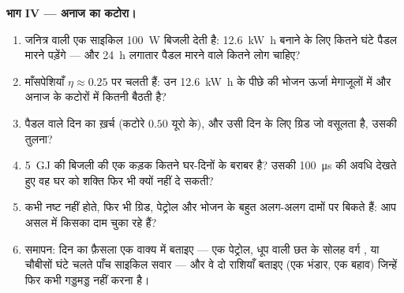 \begin{problem}
\medskip
\noindent\textbf{भाग IV --- अनाज का कटोरा।}
\begin{enumerate}[resume]
  \item जनित्र वाली एक साइकिल \qty{100}{W} बिजली देती है: \qty{12.6}{kW.h} बनाने के
        लिए कितने घंटे पैडल मारने पड़ेंगे --- और \qty{24}{h} लगातार पैडल
        मारने वाले कितने लोग चाहिए?
  \item माँसपेशियाँ $\eta \approx 0.25$ पर चलती हैं: उन \qty{12.6}{kW.h} के पीछे की भोजन
        ऊर्जा मेगाजूलों में और अनाज के कटोरों में कितनी बैठती
        है?
  \item पैडल वाले दिन का ख़र्च (कटोरे $0.50$ यूरो के), और उसी दिन के
        लिए ग्रिड जो वसूलता है, उसकी तुलना?
  \item \qty{5}{GJ} की बिजली की एक कड़क कितने घर-दिनों के बराबर है? उसकी
        \qty{100}{\micro s} की अवधि देखते हुए वह घर को शक्ति फिर भी क्यों
        नहीं दे सकती?
  \item {} कभी नष्ट नहीं होते, फिर भी ग्रिड, पेट्रोल और भोजन के
         बहुत अलग-अलग दामों पर बिकते हैं: आप असल में किसका
        दाम चुका रहे हैं?
  \item समापन: दिन का फ़ैसला एक वाक्य में बताइए --- एक
         पेट्रोल, धूप वाली छत के सोलह वर्ग
        , या चौबीसों घंटे चलते पाँच साइकिल सवार --- और वे
        दो राशियाँ बताइए (एक भंडार, एक बहाव) जिन्हें फिर कभी गड्डमड्ड
        नहीं करना है।
\end{enumerate}
\end{problem}
